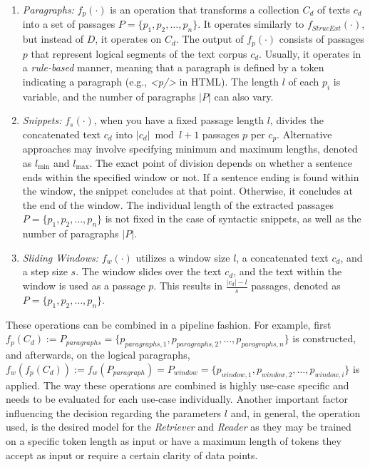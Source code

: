 \begin{enumerate}
    \item \textit{Paragraphs:} $f_p(\cdot)$ is an operation that transforms a collection $C_d$ of texts $c_d$ into a set of passages $P = \{p_1, p_2, \dots, p_n\}$. It operates similarly to $f_{StrucExt}(\cdot)$, but instead of $D$, it operates on $C_d$. The output of $f_p(\cdot)$ consists of passages $p$ that represent logical segments of the text corpus $c_d$. Usually, it operates in a \textit{rule-based} manner, meaning that a paragraph is defined by a token indicating a paragraph (e.g., \textit{<p/>} in HTML). The length $l$ of each $p_i$ is variable, and the number of paragraphs $|P|$ can also vary.
    \item \textit{Snippets:} $f_s(\cdot)$, when you have a fixed passage length $l$, divides the concatenated text $c_d$ into $|c_d|\bmod{l} + 1$ passages $p$ per $c_p$. Alternative approaches may involve specifying minimum and maximum lengths, denoted as $l_{\text{min}}$ and $l_{\text{max}}$. The exact point of division depends on whether a sentence ends within the specified window or not. If a sentence ending is found within the window, the snippet concludes at that point. Otherwise, it concludes at the end of the window. The individual length of the extracted passages $P = \{p_1, p_2, \ldots, p_n\}$ is not fixed in the case of syntactic snippets, as well as the number of paragraphs $|P|$.
    \item \textit{Sliding Windows:} $f_w(\cdot)$ utilizes a window size $l$, a concatenated text $c_d$, and a step size $s$. The window slides over the text $c_d$, and the text within the window is used as a passage $p$. This results in $\frac{|c_d| - l}{s}$ passages, denoted as $P = \{p_1, p_2, \ldots, p_n\}$.
\end{enumerate}

These operations can be combined in a pipeline fashion. For example, first $f_p(C_d) := P_{paragraphs} = \{p_{paragraphs,1}, p_{paragraphs,2}, \dots, p_{paragraphs,n}\}$ is constructed, and afterwards, on the logical paragraphs, $f_w(f_p(C_d)) := f_w(P_{paragraph}) = P_{window} = \{p_{window,1}, \allowbreak p_{window,2}, \allowbreak \dots, p_{window,i}\}$ is applied. The way these operations are combined is highly use-case specific and needs to be evaluated for each use-case individually. Another important factor influencing the decision regarding the parameters $l$ and, in general, the operation used, is the desired model for the \textit{Retriever} and \textit{Reader} as they may be trained on a specific token length as input or have a maximum length of tokens they accept as input or require a certain clarity of data points.


